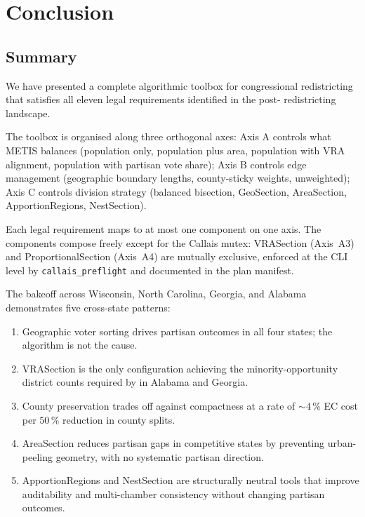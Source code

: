 \section{Conclusion}
\label{sec:conclusion}

\subsection{Summary}

We have presented a complete algorithmic toolbox for congressional redistricting
that satisfies all eleven legal requirements identified in the post-\callais{}
redistricting landscape.

The toolbox is organised along three orthogonal axes:
Axis A controls what METIS balances (population only, population plus area,
population with VRA alignment, population with partisan vote share);
Axis B controls edge management (geographic boundary lengths, county-sticky
weights, unweighted);
Axis C controls division strategy (balanced bisection, GeoSection, AreaSection,
ApportionRegions, NestSection).

Each legal requirement maps to at most one component on one axis.
The components compose freely except for the Callais mutex: VRASection (Axis~A3)
and ProportionalSection (Axis~A4) are mutually exclusive, enforced at the CLI
level by \texttt{callais\_preflight} and documented in the plan manifest.

The bakeoff across Wisconsin, North Carolina, Georgia, and Alabama demonstrates
five cross-state patterns:
\begin{enumerate}
  \item Geographic voter sorting drives partisan outcomes in all four states;
    the algorithm is not the cause.
  \item VRASection is the only configuration achieving the minority-opportunity
    district counts required by \allenmilligan{} in Alabama and Georgia.
  \item County preservation trades off against compactness at a rate of
    $\sim 4\,\%$ EC cost per $50\,\%$ reduction in county splits.
  \item AreaSection reduces partisan gaps in competitive states by preventing
    urban-peeling geometry, with no systematic partisan direction.
  \item ApportionRegions and NestSection are structurally neutral tools that
    improve auditability and multi-chamber consistency without changing
    partisan outcomes.
\end{enumerate}

